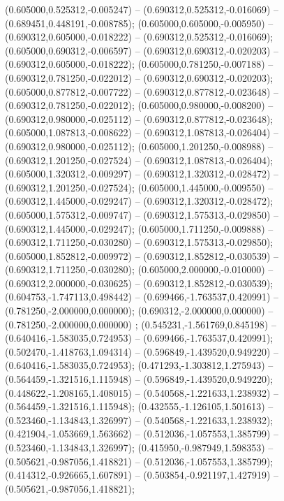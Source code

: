  (0.605000,0.525312,-0.005247) -- (0.690312,0.525312,-0.016069) -- (0.689451,0.448191,-0.008785);
 (0.605000,0.605000,-0.005950) -- (0.690312,0.605000,-0.018222) -- (0.690312,0.525312,-0.016069);
 (0.605000,0.690312,-0.006597) -- (0.690312,0.690312,-0.020203) -- (0.690312,0.605000,-0.018222);
 (0.605000,0.781250,-0.007188) -- (0.690312,0.781250,-0.022012) -- (0.690312,0.690312,-0.020203);
 (0.605000,0.877812,-0.007722) -- (0.690312,0.877812,-0.023648) -- (0.690312,0.781250,-0.022012);
 (0.605000,0.980000,-0.008200) -- (0.690312,0.980000,-0.025112) -- (0.690312,0.877812,-0.023648);
 (0.605000,1.087813,-0.008622) -- (0.690312,1.087813,-0.026404) -- (0.690312,0.980000,-0.025112);
 (0.605000,1.201250,-0.008988) -- (0.690312,1.201250,-0.027524) -- (0.690312,1.087813,-0.026404);
 (0.605000,1.320312,-0.009297) -- (0.690312,1.320312,-0.028472) -- (0.690312,1.201250,-0.027524);
 (0.605000,1.445000,-0.009550) -- (0.690312,1.445000,-0.029247) -- (0.690312,1.320312,-0.028472);
 (0.605000,1.575312,-0.009747) -- (0.690312,1.575313,-0.029850) -- (0.690312,1.445000,-0.029247);
 (0.605000,1.711250,-0.009888) -- (0.690312,1.711250,-0.030280) -- (0.690312,1.575313,-0.029850);
 (0.605000,1.852812,-0.009972) -- (0.690312,1.852812,-0.030539) -- (0.690312,1.711250,-0.030280);
 (0.605000,2.000000,-0.010000) -- (0.690312,2.000000,-0.030625) -- (0.690312,1.852812,-0.030539);
 (0.604753,-1.747113,0.498442) -- (0.699466,-1.763537,0.420991) -- (0.781250,-2.000000,0.000000);
 (0.690312,-2.000000,0.000000) -- (0.781250,-2.000000,0.000000) ;
 (0.545231,-1.561769,0.845198) -- (0.640416,-1.583035,0.724953) -- (0.699466,-1.763537,0.420991);
 (0.502470,-1.418763,1.094314) -- (0.596849,-1.439520,0.949220) -- (0.640416,-1.583035,0.724953);
 (0.471293,-1.303812,1.275943) -- (0.564459,-1.321516,1.115948) -- (0.596849,-1.439520,0.949220);
 (0.448622,-1.208165,1.408015) -- (0.540568,-1.221633,1.238932) -- (0.564459,-1.321516,1.115948);
 (0.432555,-1.126105,1.501613) -- (0.523460,-1.134843,1.326997) -- (0.540568,-1.221633,1.238932);
 (0.421904,-1.053669,1.563662) -- (0.512036,-1.057553,1.385799) -- (0.523460,-1.134843,1.326997);
 (0.415950,-0.987949,1.598353) -- (0.505621,-0.987056,1.418821) -- (0.512036,-1.057553,1.385799);
 (0.414312,-0.926665,1.607891) -- (0.503854,-0.921197,1.427919) -- (0.505621,-0.987056,1.418821);
